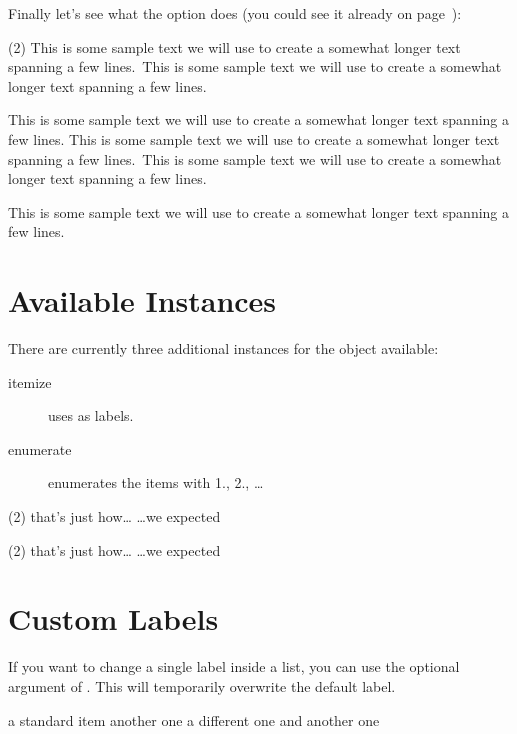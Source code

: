 \documentclass[load-preamble+]{cnltx-doc}
\newcommand*\sample{This is some sample text we will use to create a somewhat
  longer text spanning a few lines.}
\newcommand*\Sample{\sample\ \sample\par\sample}
\begin{document}
Finally let's see what the  option does (you could see it
already on page~\pageref{debug}):
\begin{example}
  \begin{tasks}(2)
    \task \Sample
    \task \Sample
  \end{tasks}
\end{example}

\section{Available Instances}\label{sec:tasks:instances}
There are currently three additional instances for the  object
available:
\begin{description}
  \item[itemize] uses  as labels.
  \item[enumerate] enumerates the items with 1., 2., \ldots
\end{description}
\begin{example}
  \begin{tasks}[style=itemize](2)
    \task that's just how\ldots
    \task \ldots we expected
  \end{tasks}
  \begin{tasks}[style=enumerate](2)
    \task that's just how\ldots
    \task \ldots we expected
  \end{tasks}
\end{example}

\section{Custom Labels}
If you want to change a single label inside a list, you can use the optional
argument of . This will temporarily overwrite the default label.
\begin{example}
  \begin{tasks}[style=itemize]
    \task a standard item
    \task another one
    \task[+] a different one
    \task and another one
  \end{tasks}
\end{example}
\end{document}
